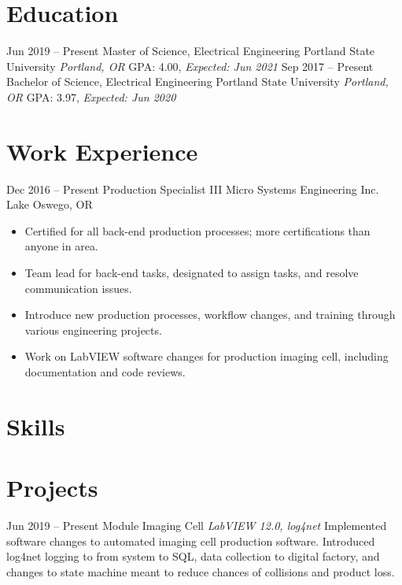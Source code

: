 \documentclass[letterpaper]{moderncv}        %
\begin{document}
\makecvtitle
\vspace*{-.8cm}
    
\section{Education}

\cventry
{Jun 2019 -- Present}
{Master of Science, Electrical Engineering}
{Portland State University}
{\textit{Portland, OR}}
{}
{GPA: 4.00, \textit{Expected: Jun 2021}}
{}
\cventry
{Sep 2017 -- Present}
{Bachelor of Science, Electrical Engineering}
{Portland State University}
{\textit{Portland, OR}}
{}
{GPA: 3.97, \textit{Expected: Jun 2020}}
{}

\section{Work Experience}
\cventry
{Dec 2016 -- Present}
{Production Specialist III}
{Micro Systems Engineering Inc.}
{Lake Oswego, OR}
{}
{\begin{itemize}%
		\item Certified for all back-end production processes; more certifications than anyone in area.
		\item Team lead for back-end tasks, designated to assign tasks, and resolve communication issues.
		\item Introduce new production processes, workflow changes, and training through various engineering projects.
		\item Work on LabVIEW software changes for production imaging cell, including documentation and code reviews.
	\end{itemize}}

\section{Skills}


\section{Projects}
\cventry
{Jun 2019 -- Present}
{Module Imaging Cell}
{}
{\textit{LabVIEW 12.0, log4net}}
{}
{Implemented software changes to automated imaging cell production software.  Introduced log4net logging to from system to SQL, data collection to digital factory, and changes to state machine meant to reduce chances of collisions and product loss.\\}
\end{document}
